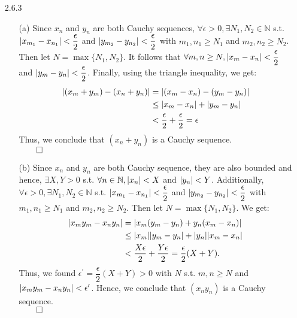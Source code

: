 \documentclass[11pt]{article}
\DeclarePairedDelimiter\abs{\lvert}{\rvert}%
\newcommand{\nats}{\mathbb{N}}
\begin{document}
\begin{itemize}
    \item[2.6.3]
        \begin{enumerate}
            \item[(a)]
                Since $x_n$ and $y_n$ are both Cauchy sequences, $\forall
                \epsilon > 0, \exists N_1, N_2 \in \nats$ s.t. $\abs{x_{m_1} -
                x_{n_1}} < \dfrac{\epsilon}{2}$ and $\abs{y_{m_2} - y_{n_2}} <
                \dfrac{\epsilon}{2}$ with $m_1, n_1 \geq N_1$ and $m_2, n_2
                \geq N_2$. Then let $N = \max{\{N_1, N_2\}}$. It follows that
                $\forall m, n \geq N, \abs{x_m - x_n} < \dfrac{\epsilon}{2}$
                and $\abs{y_m - y_n} < \dfrac{\epsilon}{2}$. Finally, using the
                triangle inequality, we get:
                \begin{align*}
                    \abs{(x_m + y_m) - (x_n + y_n)} &=
                    \abs{(x_m - x_n) - (y_m - y_n)}\\
                    &\leq \abs{x_m - x_n} + \abs{y_m - y_n}\\
                    &< \dfrac{\epsilon}{2} + \dfrac{\epsilon}{2} = \epsilon
                \end{align*}
                Thus, we conclude that $(x_n + y_n)$ is a Cauchy sequence.\\
                $\qed$

            \item[(b)]
                Since $x_n$ and $y_n$ are both Cauchy sequence, they are also
                bounded and hence, $\exists X, Y  >0$ s.t. $\forall n \in
                \nats, \abs{x_n} < X$ and $\abs{y_n} < Y$. Additionally,
                $\forall \epsilon > 0, \exists N_1, N_2 \in \nats$ s.t.
                $\abs{x_{m_1} - x_{n_1}} < \dfrac{\epsilon}{2}$ and
                $\abs{y_{m_2} - y_{n_2}} < \dfrac{\epsilon}{2}$ with $m_1, n_1
                \geq N_1$ and $m_2, n_2 \geq N_2$. Then let $N = \max{\{N_1,
                N_2\}}$. We get:
                \begin{align*}
                    \abs{x_my_m - x_ny_n} &=
                    \abs{x_m(y_m - y_n) + y_n(x_m - x_n)}\\
                    &\leq \abs{x_m}\abs{y_m - y_n} +
                    \abs{y_n}\abs{x_m - x_n}\\
                    &< \dfrac{X\epsilon}{2} + \dfrac{Y\epsilon}{2} =
                    \dfrac{\epsilon}{2}(X + Y).
                \end{align*}
                Thus, we found $\epsilon^{\prime} = \dfrac{\epsilon}{2}(X + Y)
                > 0$ with $N$ s.t. $m, n \geq N$ and $\abs{x_my_m - x_ny_n} <
                \epsilon^\prime$.  Hence, we conclude that $(x_ny_n)$ is a
                Cauchy sequence.\\
                $\qed$
        \end{enumerate}


\end{itemize}
\end{document}
